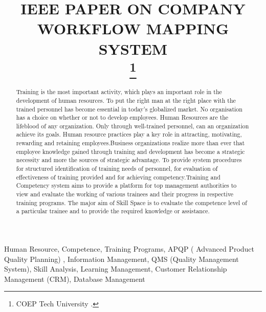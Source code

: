 \documentclass[conference]{IEEEtran}
\begin{document}
\title{IEEE PAPER ON COMPANY WORKFLOW MAPPING SYSTEM\\
\thanks{COEP Tech University .}
}

\author{
\and
{}

 }

\maketitle

\begin{abstract}
Training is the most important activity, which plays an important role in the 
development of human resources. To put the right man at the right place with the trained personnel has become essential in today’s globalized market. No organisation has a choice on whether or not to develop employees. Human Resources are the lifeblood of any organization. 
Only through well-trained personnel, can an organization achieve its goals.
Human resource practices play a key role in attracting, motivating, rewarding and 
retaining employees.Business organizations realize more than ever that employee knowledge gained through training and development has become a strategic necessity and more the sources of strategic advantage. To provide system procedures for structured identification of training needs of personnel, for evaluation of effectiveness of training provided and for achieving competency.Training and Competency system aims to provide a platform for top management authorities to view and evaluate the working of various trainees and their progress in respective training programs. The major aim of Skill Space is to evaluate the competence level of a particular trainee and to provide the required knowledge or assistance. 

\end{abstract}

\begin{IEEEkeywords}
Human Resource, Competence, Training Programs, APQP ( Advanced Product Quality 
Planning) , Information Management, QMS (Quality Management System), Skill Analysis, Learning Management, Customer Relationship Management (CRM), Database 
Management
\end{IEEEkeywords}
\end{document}
